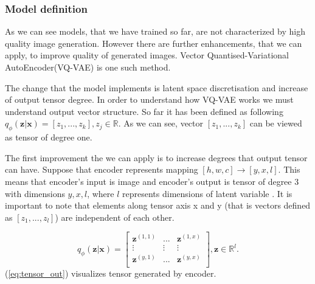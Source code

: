 \documentclass[10pt]{article}
\begin{document}
\subsubsection{Model definition}
As we can see models, that we have trained so far, are not characterized by high quality image generation. However there are further enhancements, that we can apply, to improve quality of generated images. Vector Quantised-Variational AutoEncoder(VQ-VAE) \cite{VQ-VAE} \cite{VQ_VAE2} is one such method. 

The change that the model implements is latent space discretisation and increase of output tensor degree. In order to understand how VQ-VAE works we must understand output vector structure. So far it has been defined as following $q_{\phi} (\textbf{z}|\textbf{x}) = [z_1, ..., z_k], z_j\in \mathbb{R} $. As we can see, vector 
$[z_1, ..., z_k]$ can be viewed as tensor of degree one. 

The first improvement the we can apply is to increase degrees that output tensor can have. Suppose that encoder represents mapping $[h, w, c] \rightarrow [y, x, l]$. This means that encoder's input is image and encoder's output is tensor of degree 3 with dimensions $y, x, l$, where $l$ represents dimensions of latent variable . It is important to note that elements along tensor axis x and y (that is vectors defined as $[z_1, ..., z_l]$) are independent of each other.

\begin{equation}\label{eq:tensor_out}
   q_{\phi} (\textbf{z}|\textbf{x}) = 
\begin{bmatrix}
\textbf{z}^{(1,1)} &...& \textbf{z}^{(1,x)} \\
\vdots  & \vdots   & \vdots \\
\textbf{z}^{(y,1)} &...& \textbf{z}^{(y,x)} \\
\end{bmatrix}, \textbf{z} \in \mathbb{R}^{l}
.
\end{equation}
(\ref{eq:tensor_out}) visualizes tensor generated by encoder. 
\end{document}
